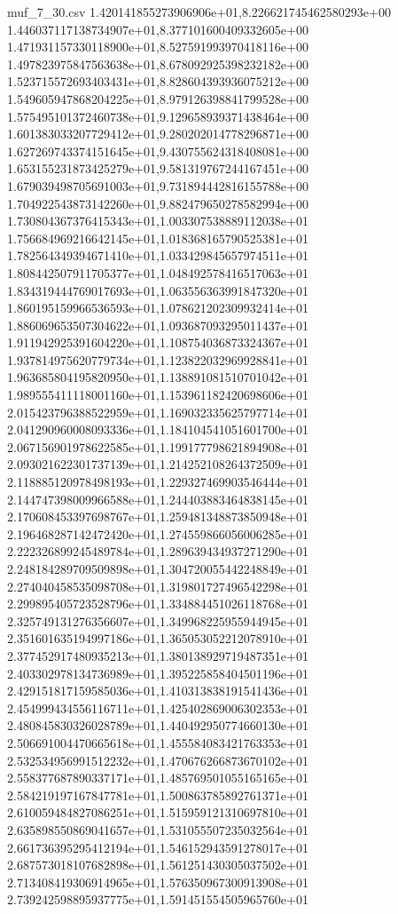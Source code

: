 \begin{filecontents*}{muf_7_30.csv}
1.420141855273906906e+01,8.226621745462580293e+00
1.446037117138734907e+01,8.377101600409332605e+00
1.471931157330118900e+01,8.527591993970418116e+00
1.497823975847563638e+01,8.678092925398232182e+00
1.523715572693403431e+01,8.828604393936075212e+00
1.549605947868204225e+01,8.979126398841799528e+00
1.575495101372460738e+01,9.129658939371438464e+00
1.601383033207729412e+01,9.280202014778296871e+00
1.627269743374151645e+01,9.430755624318408081e+00
1.653155231873425279e+01,9.581319767244167451e+00
1.679039498705691003e+01,9.731894442816155788e+00
1.704922543873142260e+01,9.882479650278582994e+00
1.730804367376415343e+01,1.003307538889112038e+01
1.756684969216642145e+01,1.018368165790525381e+01
1.782564349394671410e+01,1.033429845657974511e+01
1.808442507911705377e+01,1.048492578416517063e+01
1.834319444769017693e+01,1.063556363991847320e+01
1.860195159966536593e+01,1.078621202309932414e+01
1.886069653507304622e+01,1.093687093295011437e+01
1.911942925391604220e+01,1.108754036873324367e+01
1.937814975620779734e+01,1.123822032969928841e+01
1.963685804195820950e+01,1.138891081510701042e+01
1.989555411118001160e+01,1.153961182420698606e+01
2.015423796388522959e+01,1.169032335625797714e+01
2.041290960008093336e+01,1.184104541051601700e+01
2.067156901978622585e+01,1.199177798621894908e+01
2.093021622301737139e+01,1.214252108264372509e+01
2.118885120978498193e+01,1.229327469903546444e+01
2.144747398009966588e+01,1.244403883464838145e+01
2.170608453397698767e+01,1.259481348873850948e+01
2.196468287142472420e+01,1.274559866056006285e+01
2.222326899245489784e+01,1.289639434937271290e+01
2.248184289709509898e+01,1.304720055442248849e+01
2.274040458535098708e+01,1.319801727496542298e+01
2.299895405723528796e+01,1.334884451026118768e+01
2.325749131276356607e+01,1.349968225955944945e+01
2.351601635194997186e+01,1.365053052212078910e+01
2.377452917480935213e+01,1.380138929719487351e+01
2.403302978134736989e+01,1.395225858404501196e+01
2.429151817159585036e+01,1.410313838191541436e+01
2.454999434556116711e+01,1.425402869006302353e+01
2.480845830326028789e+01,1.440492950774660130e+01
2.506691004470665618e+01,1.455584083421763353e+01
2.532534956991512232e+01,1.470676266873670102e+01
2.558377687890337171e+01,1.485769501055165165e+01
2.584219197167847781e+01,1.500863785892761371e+01
2.610059484827086251e+01,1.515959121310697810e+01
2.635898550869041657e+01,1.531055507235032564e+01
2.661736395295412194e+01,1.546152943591278017e+01
2.687573018107682898e+01,1.561251430305037502e+01
2.713408419306914965e+01,1.576350967300913908e+01
2.739242598895937775e+01,1.591451554505965760e+01

\end{filecontents*}

